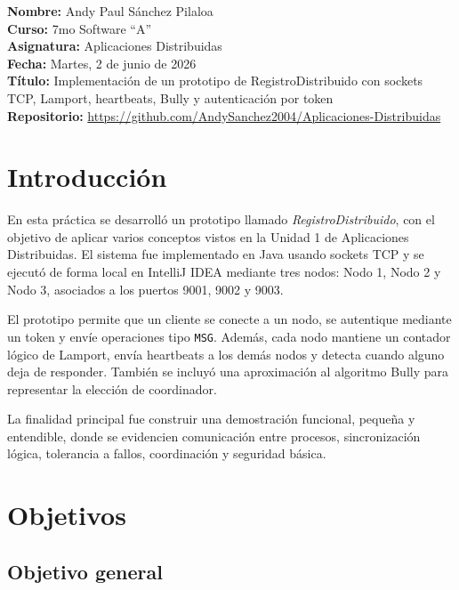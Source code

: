 \documentclass[12pt,a4paper]{article}
\begin{document}
\noindent
\textbf{Nombre:} Andy Paul Sánchez Pilaloa\\
\textbf{Curso:} 7mo Software ``A''\\
\textbf{Asignatura:} Aplicaciones Distribuidas\\
\textbf{Fecha:} Martes, 2 de junio de 2026\\
\textbf{Título:} Implementación de un prototipo de RegistroDistribuido con sockets TCP, Lamport, heartbeats, Bully y autenticación por token\\
\textbf{Repositorio:} \url{https://github.com/AndySanchez2004/Aplicaciones-Distribuidas}

\vspace{0.5cm}

\tableofcontents
\newpage

\section{Introducción}

En esta práctica se desarrolló un prototipo llamado \textit{RegistroDistribuido}, con el objetivo de aplicar varios conceptos vistos en la Unidad 1 de Aplicaciones Distribuidas. El sistema fue implementado en Java usando sockets TCP y se ejecutó de forma local en IntelliJ IDEA mediante tres nodos: Nodo 1, Nodo 2 y Nodo 3, asociados a los puertos 9001, 9002 y 9003.

El prototipo permite que un cliente se conecte a un nodo, se autentique mediante un token y envíe operaciones tipo \texttt{MSG}. Además, cada nodo mantiene un contador lógico de Lamport, envía heartbeats a los demás nodos y detecta cuando alguno deja de responder. También se incluyó una aproximación al algoritmo Bully para representar la elección de coordinador.

La finalidad principal fue construir una demostración funcional, pequeña y entendible, donde se evidencien comunicación entre procesos, sincronización lógica, tolerancia a fallos, coordinación y seguridad básica.

\section{Objetivos}

\subsection{Objetivo general}
\end{document}

